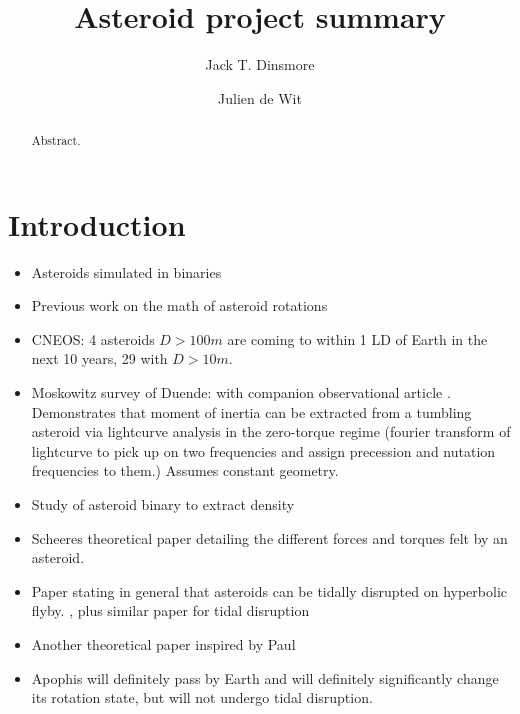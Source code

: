 \documentclass{aastex631}
\begin{document}
\title{Asteroid project summary}


\author[0000-0002-6401-778X]{Jack T. Dinsmore}

\author{Julien de Wit}

\begin{abstract}

Abstract. 
\end{abstract}




\section{Introduction}

\begin{itemize}
\item Asteroids simulated in binaries \cite{Naidu_2015}
\item Previous work on the math of asteroid rotations \cite{ashenberg07, paul88}
\item CNEOS: 4 asteroids $D > 100 m$ are coming to within 1 LD of Earth in the next 10 years, 29 with $D > 10 m$.
\item Moskowitz survey of Duende: \cite{BENSON2020113518} with companion observational article \cite{MOSKOVITZ2020113519}. Demonstrates that moment of inertia can be extracted from a tumbling asteroid via lightcurve analysis in the zero-torque regime (fourier transform of lightcurve to pick up on two frequencies and assign precession and nutation frequencies to them.) Assumes constant geometry.
\item Study of asteroid binary to extract density \cite{DESCAMPS2020113726}
\item Scheeres theoretical paper \cite{HouMar2017} detailing the different forces and torques felt by an asteroid.
\item Paper stating in general that asteroids can be tidally disrupted on hyperbolic flyby. \cite{SCHEERES2000106}, plus similar paper \cite{RICHARDSON199847} for tidal disruption
\item Another theoretical paper \cite{BOUE2009750} inspired by Paul
\item Apophis will definitely pass by Earth and will definitely significantly change its rotation state, but will not undergo tidal disruption. \cite{SCHEERES2005281}
\end{itemize}
\end{document}

